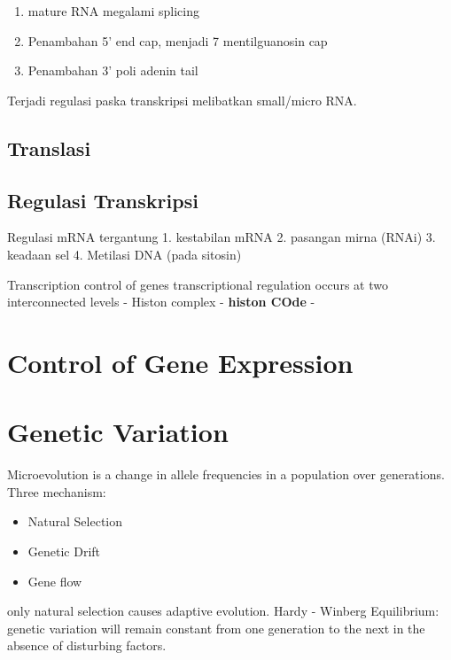 \documentclass[
  letterpaper,
  DIV=11,
  numbers=noendperiod]{scrreprt}
\providecommand{\tightlist}{%
  \setlength{\itemsep}{0pt}\setlength{\parskip}{0pt}}\usepackage{longtable,booktabs,array}
\begin{document}
\begin{enumerate}
\def\labelenumi{\arabic{enumi}.}
\tightlist
\item
  mature RNA megalami splicing
\item
  Penambahan 5' end cap, menjadi 7 mentilguanosin cap
\item
  Penambahan 3' poli adenin tail
\end{enumerate}

Terjadi regulasi paska transkripsi melibatkan small/micro RNA.

\subsection{Translasi}\label{translasi}

\subsection{Regulasi Transkripsi}\label{regulasi-transkripsi}

Regulasi mRNA tergantung 1. kestabilan mRNA 2. pasangan mirna (RNAi) 3.
keadaan sel 4. Metilasi DNA (pada sitosin)

Transcription control of genes transcriptional regulation occurs at two
interconnected levels - Histon complex - \textbf{histon COde} -

\section{Control of Gene Expression}\label{control-of-gene-expression}

\section{Genetic Variation}\label{genetic-variation}

Microevolution is a change in allele frequencies in a population over
generations. Three mechanism:

\begin{itemize}
\tightlist
\item
  Natural Selection
\item
  Genetic Drift
\item
  Gene flow
\end{itemize}

only natural selection causes adaptive evolution. Hardy - Winberg
Equilibrium: genetic variation will remain constant from one generation
to the next in the absence of disturbing factors.
\end{document}
